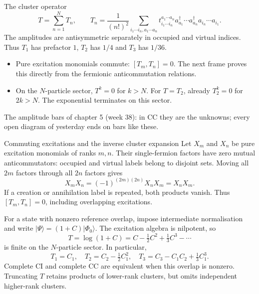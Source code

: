 \documentclass[aspectratio=169,10pt]{beamer}
\newcommand{\ket}[1]{\vert #1\rangle}
\newcommand{\ph}{\Phi_0}
\begin{document}
\begin{frame}{The cluster operator}
\small
\[
 T=\sum_{n=1}^{N}T_n,\qquad
 T_n=\frac1{(n!)^2}\sum_{i_1\cdots i_n,a_1\cdots a_n}
 t_{i_1\cdots i_n}^{a_1\cdots a_n}
 a_{a_1}^\dagger\cdots a_{a_n}^\dagger a_{i_n}\cdots a_{i_1}.
\]
The amplitudes are antisymmetric separately in occupied and virtual indices. Thus $T_1$ has prefactor $1$, $T_2$ has $1/4$ and $T_3$ has $1/36$.
\begin{itemize}
\item Pure excitation monomials commute: $[T_m,T_n]=0$. The next frame proves this directly from the fermionic anticommutation relations.
\item On the $N$-particle sector, $T^k=0$ for $k>N$. For $T=T_2$, already $T_2^k=0$ for $2k>N$. The exponential terminates on this sector.
\end{itemize}
\begin{center}
\hspace{3em}
\par\small The amplitude bars of chapter 5 (week 38): in CC they are the unknowns; every open diagram of yesterday ends on bars like these.
\end{center}
\end{frame}

\begin{frame}{Commuting excitations and the inverse cluster expansion}
Let $X_m$ and $X_n$ be pure excitation monomials of ranks $m,n$. Their single-fermion factors have zero mutual anticommutators: occupied and virtual labels belong to disjoint sets. Moving all $2m$ factors through all $2n$ factors gives
\[
 X_mX_n=(-1)^{(2m)(2n)}X_nX_m=X_nX_m.
\]
If a creation or annihilation label is repeated, both products vanish. Thus $[T_m,T_n]=0$, including overlapping excitations.
\medskip

For a state with nonzero reference overlap, impose intermediate normalisation and write $\ket{\Psi}=(1+C)\ket{\ph}$. The excitation algebra is nilpotent, so
\[
 T=\log(1+C)=C-\tfrac12C^2+\tfrac13C^3-\cdots
\]
is finite on the $N$-particle sector. In particular,
\[
 T_1=C_1,\quad T_2=C_2-\tfrac12C_1^2,\quad
 T_3=C_3-C_1C_2+\tfrac13C_1^3.
\]
Complete CI and complete CC are equivalent when this overlap is nonzero. Truncating $T$ retains products of lower-rank clusters, but omits independent higher-rank clusters.
\end{frame}
\end{document}
